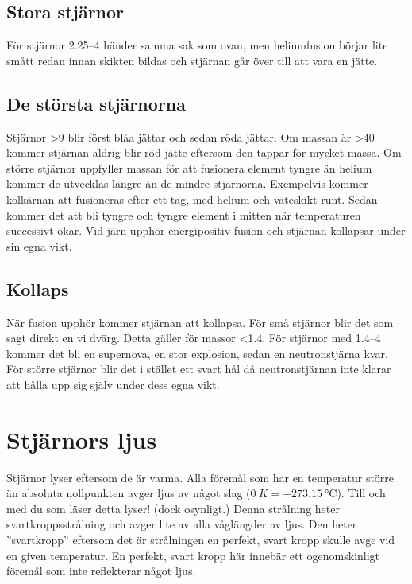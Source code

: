 \subsection{Stora stjärnor}
För stjärnor \qtyrange{2.25}{4}{\Mo} händer samma sak som ovan, men heliumfusion börjar lite smått redan innan skikten bildas och stjärnan går över till att vara en jätte.

\subsection{De största stjärnorna}
Stjärnor \qty{>9}{\Mo} blir först blåa jättar och sedan röda jättar. Om massan är \qty{>40}{\Mo} kommer stjärnan aldrig blir röd jätte eftersom den tappar för mycket massa. Om större stjärnor uppfyller massan för att fusionera element tyngre än helium kommer de utvecklas längre än de mindre stjärnorna. Exempelvis kommer kolkärnan att fusioneras efter ett tag, med helium och väteskikt runt. Sedan kommer det att bli tyngre och tyngre element i mitten när temperaturen successivt ökar. Vid järn upphör energipositiv fusion och stjärnan kollapsar under sin egna vikt.

\subsection{Kollaps}
När fusion upphör kommer stjärnan att kollapsa. För små stjärnor blir det som sagt direkt en vi dvärg. Detta gäller för massor \qty{<1.4}{\Mo}. För stjärnor med \qtyrange{1.4}{4}{\Mo} kommer det bli en supernova, en stor explosion, sedan en neutronstjärna kvar. För större stjärnor blir det i stället ett svart hål då neutronstjärnan inte klarar att hålla upp sig själv under dess egna vikt.


\section{Stjärnors ljus}
Stjärnor lyser eftersom de är varma. Alla föremål som har en temperatur större än absoluta nollpunkten avger ljus av något slag ($\qty{0}{K} = \qty{-273.15}{\degreeCelsius}$). Till och med du som läser detta lyser! (dock osynligt.) Denna strålning heter svartkroppsstrålning och avger lite av alla våglängder av ljus. Den heter ''svartkropp'' eftersom det är strålningen en perfekt, svart kropp skulle avge vid en given temperatur. En perfekt, svart kropp här innebär ett ogenomskinligt föremål som inte reflekterar något ljus.
